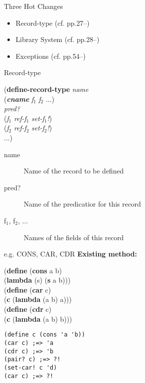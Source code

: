 \documentclass[dvipdfm,12pt,fleqn]{beamer}
\begin{document}
\begin{frame}{Three Hot Changes\footnotemark[1]}
\huge
\begin{itemize}
\item \alert{Record-type} (cf. pp.27--)
\item Library System (cf. pp.28--)
\item Exceptions (cf. pp.54--)
\end{itemize}

\end{frame}

\begin{frame}{Record-type}
\begin{screen}
(\textbf{define-record-type} \textit{name}\\
\hspace{1em}(\textbf{\textit{cname}} \textit{f$_1$} \textit{f$_2$} ...)\\
\hspace{1em}\textit{pred?}\\
\hspace{1em}(\textit{f$_1$} \textit{ref-f$_1$} \textit{set-f$_1$!})\\
\hspace{1em}(\textit{f$_2$} \textit{ref-f$_2$} \textit{set-f$_2$!})\\
\hspace{1em}...)
\end{screen}
\begin{description}
\item[name] Name of the record to be defined
\item[pred?] Name of the predicatior for this record
\item[f$_1$, f$_2$, ...] Names of the fields of this record
\end{description}
\end{frame}

\begin{frame}[containsverbatim]{e.g. CONS, CAR, CDR}
\textbf{Existing method:}
\begin{screen}
(\textbf{define} (\textbf{cons} a b)\\
\hspace{1em}(\textbf{lambda} (s) (\textbf{s} a b)))\\
(\textbf{define} (\textbf{car} c)\\
\hspace{1em}(\textbf{c} (\textbf{lambda} (a b) a)))\\
(\textbf{define} (\textbf{cdr} c)\\
\hspace{1em}(\textbf{c} (\textbf{lambda} (a b) b)))\\
\end{screen}

\begin{multicols}{2}
\begin{verbatim}
(define c (cons 'a 'b))
(car c) ;=> 'a
(cdr c) ;=> 'b
(pair? c) ;=> ?!
(set-car! c 'd)
(car c) ;=> ?!
\end{verbatim}
\end{multicols}
\end{frame}
\end{document}
